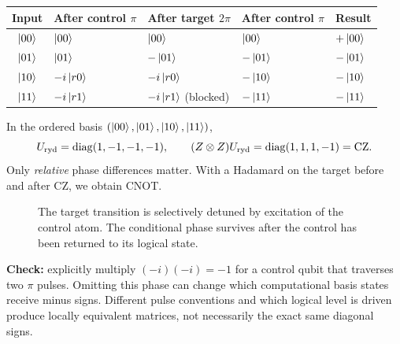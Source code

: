 \begin{center}
\small
\renewcommand{\arraystretch}{1.18}
\begin{tabularx}{\linewidth}{@{}cXXXX@{}}\toprule
Input&After control $\pi$&After target $2\pi$&After control $\pi$&Result\\\midrule
$\left\lvert 00\right\rangle$&$\left\lvert 00\right\rangle$&$\left\lvert 00\right\rangle$&$\left\lvert 00\right\rangle$&$+\left\lvert 00\right\rangle$\\
$\left\lvert 01\right\rangle$&$\left\lvert 01\right\rangle$&$-\left\lvert 01\right\rangle$&$-\left\lvert 01\right\rangle$&$-\left\lvert 01\right\rangle$\\
$\left\lvert 10\right\rangle$&$-i\left\lvert r0\right\rangle$&$-i\left\lvert r0\right\rangle$&$-\left\lvert 10\right\rangle$&$-\left\lvert 10\right\rangle$\\
$\left\lvert 11\right\rangle$&$-i\left\lvert r1\right\rangle$&$-i\left\lvert r1\right\rangle$ (blocked)&$-\left\lvert 11\right\rangle$&$-\left\lvert 11\right\rangle$\\\bottomrule
\end{tabularx}
\end{center}
In the ordered basis $(\left\lvert 00\right\rangle,\left\lvert 01\right\rangle,\left\lvert 10\right\rangle,\left\lvert 11\right\rangle)$,
\begin{equation}
U_{\rm ryd}=\operatorname{diag}(1,-1,-1,-1),\qquad
(Z\otimes Z)U_{\rm ryd}=\operatorname{diag}(1,1,1,-1)=\mathrm{CZ}.
\end{equation}
Only \emph{relative} phase differences matter. With a Hadamard on the target before and after CZ, we obtain CNOT.

\begin{figure}[htbp]
\centering
{}
\caption{The target transition is selectively detuned by excitation of the control atom. The conditional phase survives after the control has been returned to its logical state.}
\end{figure}

\begin{examtip}
\textbf{Check:} explicitly multiply $(-i)(-i)=-1$ for a control qubit that traverses two $\pi$ pulses. Omitting this phase can change which computational basis states receive minus signs. Different pulse conventions and which logical level is driven produce locally equivalent matrices, not necessarily the exact same diagonal signs.
\end{examtip}

